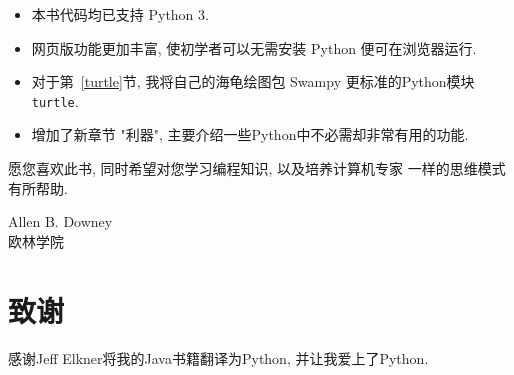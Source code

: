 \documentclass[10pt]{book}
\begin{document}
\begin{itemize}

\item 本书代码均已支持 Python 3.

\item 网页版功能更加丰富, 使初学者可以无需安装 Python 便可在浏览器运行. 

\item 对于第~\ref{turtle}节, 我将自己的海龟绘图包 Swampy 更标准的Python模块{\tt turtle}. 

\item 增加了新章节 "利器", 主要介绍一些Python中不必需却非常有用的功能. 

\end{itemize}

愿您喜欢此书, 同时希望对您学习编程知识, 以及培养计算机专家
一样的思维模式有所帮助. 

%
Allen B. Downey \\

欧林学院 \\

\section*{致谢}

感谢Jeff Elkner将我的Java书籍翻译为Python, 
并让我爱上了Python.
\end{document}
